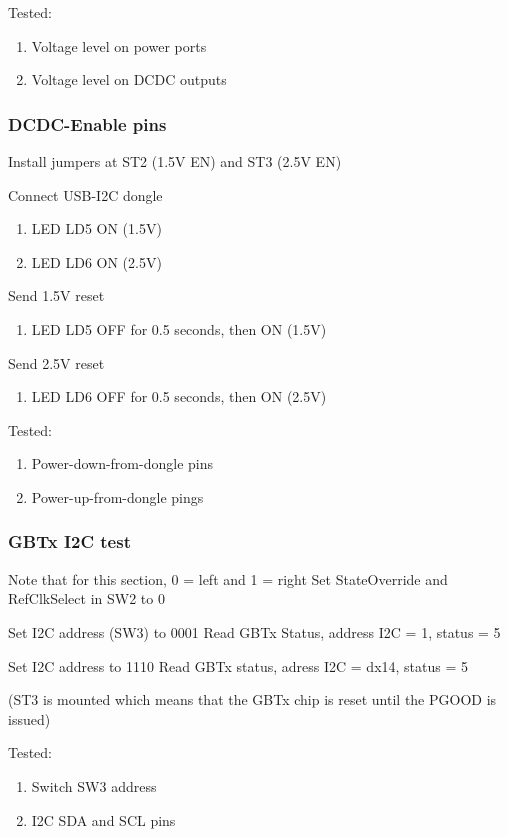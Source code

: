 Tested:
\begin{enumerate}
    \item Voltage level on power ports
    \item Voltage level on DCDC outputs
\end{enumerate}

\subsubsection{DCDC-Enable pins}

Install jumpers at ST2 (1.5V EN) and ST3 (2.5V EN)

Connect USB-I2C dongle

\begin{enumerate}
    \item LED LD5 ON (1.5V)
    \item LED LD6 ON (2.5V)
\end{enumerate}

Send 1.5V reset
\begin{enumerate}
    \item LED LD5 OFF for 0.5 seconds, then ON (1.5V)
\end{enumerate}

Send 2.5V reset
\begin{enumerate}
    \item LED LD6 OFF for 0.5 seconds, then ON (2.5V)
\end{enumerate}

Tested:
\begin{enumerate}
    \item Power-down-from-dongle pins
    \item Power-up-from-dongle pings
\end{enumerate}


\subsubsection{GBTx I2C test}

Note that for this section, 0 = left and 1 = right
Set StateOverride and RefClkSelect in SW2 to 0

Set I2C address (SW3) to 0001
Read GBTx Status, address I2C = 1, status = 5

Set I2C address to 1110
Read GBTx status, adress I2C = dx14, status = 5

(ST3 is mounted which means that the GBTx chip is reset until the PGOOD is issued)

Tested:
\begin{enumerate}
    \item Switch SW3 address
    \item I2C SDA and SCL pins
\end{enumerate}

